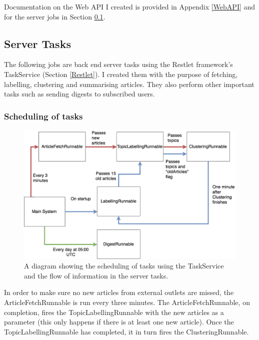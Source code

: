 \documentclass[12pt]{article}
\begin{document}
Documentation on the Web API I created is provided in Appendix \ref{WebAPI} and for the server jobs in Section \ref{ServerTasks}.

\subsection{Server Tasks}

\label{ServerTasks}

The following jobs are back end server tasks using the Restlet framework's TaskService (Section \ref{Restlet}). I created them with the purpose of fetching, labelling, clustering and summarising articles. They also perform other important tasks such as sending digests to subscribed users.  

\subsubsection{Scheduling of tasks}

\begin{figure}[ht!]
  \centering
    \includegraphics[scale=0.3]{TaskService.png}
   \caption[A diagram showing the scheduling of tasks]{A diagram showing the scheduling of tasks using the TaskService and the flow of information in the server tasks.}
   \label{servertasks}
\end{figure} 

In order to make sure no new articles from external outlets are missed, the ArticleFetchRunnable is run every three minutes. The ArticleFetchRunnable, on completion, fires the TopicLabellingRunnable with the new articles as a parameter (this only happens if there is at least one new article). Once the TopicLabellingRunnable has completed, it in turn fires the ClusteringRunnable. 
\end{document}
